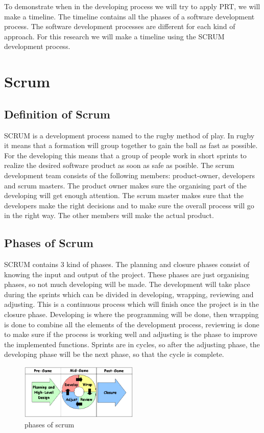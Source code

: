 To demonstrate when in the developing process we will try to apply PRT, we will make a timeline. The timeline contains all the phases of a software development process. The software development processes are different for each kind of approach. For this research we will make a timeline using the SCRUM development process.
\section{Scrum} 
\subsection{Definition of Scrum}
SCRUM is a development process named to the rugby method of play. In rugby it means that a formation will group together to gain the ball as fast as possible. For the developing this means that a group of people work in short sprints to realize the desired software product as soon as safe as posible. The scrum development team consists of the following members: product-owner, developers and scrum masters. The product owner makes sure the organising part of the developing will get enough attention. The scrum master makes sure that the developers make the right decisions and to make sure the overall process will go in the right way. The other members will make the actual product. 
\subsection{Phases of Scrum}
SCRUM contains 3 kind of phases. The planning and closure phases consist of knowing the input and output of the project. These phases are just organising phases, so not much developing will be made. The development will take place during the sprints which can be divided in developing, wrapping, reviewing and adjusting. This is a continuous process which will finish once the project is in the closure phase. Developing is where the programming will be done, then wrapping is done to combine all the elements of the development process, reviewing is done to make sure if the process is working well and adjusting is the phase to improve the implemented functions. Sprints are in cycles, so after the adjusting phase, the developing phase will be the next phase, so that the cycle is complete.

\begin{figure}[h]
\begin{center}
	\includegraphics[width=0.5\textwidth]{Figures/diagram01.png}
\end{center}
	\caption{phases of scrum}

\end{figure}

